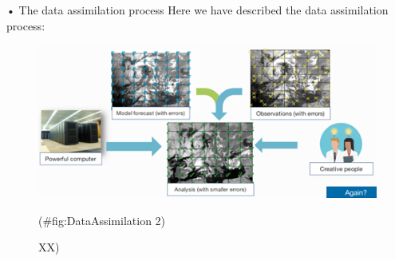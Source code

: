 \documentclass[12pt,oneside]{book}
\begin{document}
• The data assimilation process Here we have described the data
assimilation process:

\begin{figure}

{\centering \includegraphics[width=0.8\linewidth]{figures/Figure74} 

}

\caption{XX)}(\#fig:DataAssimilation 2)
\end{figure}
\end{document}
